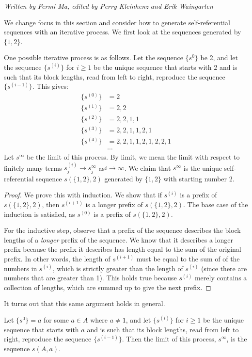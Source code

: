 \documentclass[runningheads,a4paper]{llncs}
\begin{document}
\emph{Written by Fermi Ma, edited by Perry Kleinhenz and Erik Waingarten}

We change focus in this section and consider how to generate self-referential sequences with an iterative process. We first look at the sequences generated by $\{1,2\}$.

One possible iterative process is as follows. Let the sequence $\{s^0\}$ be 2, and let the sequence $\{s^{(i)}\}$ for $i \geq 1$ be the unique sequence that starts with 2 and is such that its block lengths, read from left to right, reproduce the sequence $\{s^{(i-1)}\}$. This gives:
\begin{align*}
\{s^{(0)}\} &= 2\\
\{s^{(1)}\} &= 2,2\\
\{s^{(2)}\} &= 2,2,1,1\\
\{s^{(3)}\} &= 2,2,1,1,2,1\\
\{s^{(4)}\} &= 2,2,1,1,2,1,2,2,1\\
&\cdots
\end{align*}
Let $s^\infty$ be the limit of this process. By limit, we mean the limit with respect to finitely many terms $s^{(i)}_j \rightarrow s^\infty_j$ as$i \rightarrow \infty$. We claim that $s^\infty$ is the unique self-referential sequence $s(\{1,2\},2)$ generated by $\{1,2\}$ with starting number 2.
\begin{proof}
We prove this with induction. We show that if $s^{(i)}$ is a prefix of $s(\{1,2\},2)$, then $s^{(i+1)}$ is a longer prefix of $s(\{1,2\},2)$. The base case of the induction is satisfied, as $s^{(0)}$ is a prefix of $s(\{1,2\},2)$.

For the inductive step, observe that a prefix of the sequence describes the block lengths of a \emph{longer} prefix of the sequence. We know that it describes a longer prefix because the prefix it describes has length equal to the sum of the original prefix. In other words, the length of $s^{(i+1)}$ must be equal to the sum of of the numbers in $s^{(i)}$, which is strictly greater than the length of $s^{(i)}$ (since there are numbers that are greater than 1). This holds true because $s^{(i)}$ merely contains a collection of lengths, which are summed up to give the next prefix. 
\end{proof}

It turns out that this same argument holds in general.

\begin{theorem}
Let $\{s^0\} = a$ for some $a \in A$ where $a \neq 1$, and let $\{s^{(i)}\}$ for $i \geq 1$ be the unique sequence that starts with $a$ and is such that its block lengths, read from left to right, reproduce the sequence $\{s^{(i-1)}\}$. Then the limit of this process, $s^\infty$, is the sequence $s(A,a)$.
\end{theorem}
\end{document}
